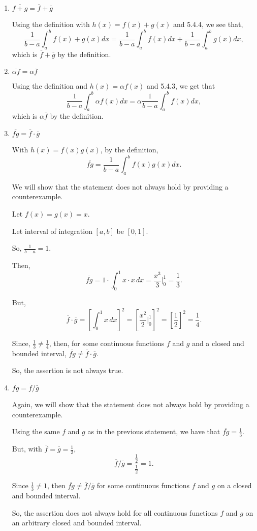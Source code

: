 \documentclass[../hw6.tex]{subfiles}
\begin{document}
\begin{enumerate}[label= (\alph*)]
    \item $\overline{f+g}=\overline{f}+\overline{g}$
    
    Using the definition with $h(x)=f(x)+g(x)$ and 5.4.4, we see that,
    \[ \frac{1}{b-a}\int_{a}^{b} f(x)+g(x) dx = \frac{1}{b-a} \int_{a}^{b} f(x) dx + \frac{1}{b-a} \int_{a}^{b} g(x) dx,\]
    which is $\overline{f}+\overline{g}$ by the definition.


    \item $\overline{\alpha f}=\alpha \overline{f}$
    
    Using the definition and $h(x)=\alpha f(x)$ and 5.4.3, we get that
    \[\frac{1}{b-a} \int_{a}^{b} \alpha f(x) dx = \alpha \frac{1}{b-a} \int_{a}^{b} f(x) dx,\]
    which is $\alpha \overline{f}$ by the definition.

    \item $\overline{fg}=\overline{f}\cdot\overline{g}$
    
    With $h(x)=f(x)g(x)$, by the definition, \[\overline{fg} = \frac{1}{b-a}\int_{a}^{b} f(x)g(x) dx.\]

    We will show that the statement does not always hold by providing a counterexample.

    Let $f(x)=g(x)=x$. 
    
    Let interval of integration $[a,b]$ be $[0,1]$.

    So, $\frac{1}{b-a} = 1$.

    Then, \[\overline{fg} = 1\cdot\int_{0}^{1} x\cdot x \, dx = \frac{x^3}{3} \bigg\vert_{0}^{1} = \frac{1}{3}.\]
    
    But, \[\overline{f}\cdot\overline{g} = {\left[ \int_{0}^{1} x\,dx \right]}^2 = {\left[ \frac{x^2}{2} \bigg\vert_{0}^1 \right]}^2 = {\left[ \frac{1}{2} \right]}^2 = \frac{1}{4}.\]

    Since, $\frac{1}{3} \neq \frac{1}{4}$, then, for some continuous functions $f$ and $g$ and a closed and bounded interval, $\overline{fg}\neq\overline{f}\cdot\overline{g}$.

    So, the assertion is not always true.

    \item $\overline{fg}=\overline{f}/\overline{g}$
    
    Again, we will show that the statement does not always hold by providing a counterexample.

    Using the same $f$ and $g$ as in the previous statement, we have that $\overline{fg}=\frac{1}{3}$.

    But, with $\overline{f}=\overline{g}=\frac{1}{2}$, \[\overline{f}/\overline{g} = \frac{\frac{1}{2}}{\frac{1}{2}} = 1.\]

    Since $\frac{1}{3} \neq 1$, then $\overline{fg}\neq\overline{f}/\overline{g}$ for some continuous functions $f$ and $g$ on a closed and bounded interval. 

    So, the assertion does not always hold for all continuous functions $f$ and $g$ on an arbitrary closed and bounded interval.

\end{enumerate}
\end{document}
